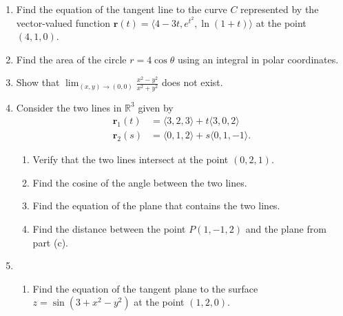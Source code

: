 \documentclass[12pt]{article}
\newcommand{\points}[1]{\marginpar{\hspace{24pt}[#1]}}
\newcommand{\di}{\displaystyle}
\newcommand{\R}{\mathbb{R}}
\begin{document}
\begin{enumerate}
\item Find the equation of the tangent line to the curve $C$ represented by the vector-valued function $\mathbf{r}(t) = \langle 4-3t, e^{t^2}, \ln(1+t)\rangle$ at the point $(4,1,0)$.\points{4}

\vspace{2.5in}

\item Find the area of the circle $r=4\cos\theta$ using an integral in polar coordinates. \points{5}

\vspace{3in}

\item Show that $\di \lim_{(x,y)\to (0,0)}\frac{x^2-y^2}{x^2+y^2}$ does not exist. \points{3}
\newpage

\item Consider the two lines in $\R^3$ given by
\begin{align*}
\mathbf{r}_1(t) & = \langle 3,2,3\rangle + t\langle 3,0,2\rangle\\
\mathbf{r}_2(s) & = \langle 0,1,2\rangle +s\langle 0,1,-1\rangle.
\end{align*}
\begin{enumerate}
\item Verify that the two lines intersect at the point $(0,2,1)$. \points{2}

\vspace{1.2in}

\item Find the cosine of the angle between the two lines. \points{3}

\vspace{1.3in}

\item Find the equation of the plane that contains the two lines. \points{4}

\vspace{2.3in}

\item Find the distance between the point $P(1,-1,2)$ and the plane from part (c).\points{3}
\end{enumerate}
\newpage


\item \begin{enumerate}
\item Find the equation of the tangent plane to the surface $z=\sin(3+x^2-y^2)$ at the point $(1,2,0)$. \points{5}


\end{enumerate}
\end{enumerate}
\end{document}
